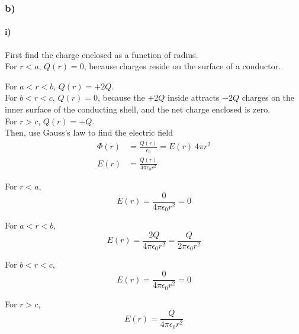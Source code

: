 \documentclass[../homework.tex]{subfiles}
\begin{document}
\subsubsection*{b)}
\paragraph{i)}

\begin{subp}

	First find the charge enclosed as a function of radius. \\


	For $r < a$, $Q(r) = 0$, because charges reside on the surface of a conductor. 

	For $a < r < b$, $Q(r) = +2Q$.\\

	For $b < r < c$, $Q(r) = 0$, because the $+2Q$ inside attracts $-2Q$ charges on the inner surface of the conducting shell, and the net charge enclosed is zero. \\

	For $r > c$, $Q(r) = +Q$. \\

	Then, use Gauss's law to find the electric field
	\begin{align*}
		\Phi(r) &= \frac{Q(r)}{\epsilon_0} = E(r)~4\pi r^2 \\
		E(r) &= \frac{Q(r)}{4 \pi \epsilon_0 r^2} 
	\end{align*}

	For $r < a$, 
	\begin{equation*}
		E(r) = \frac{0}{4 \pi \epsilon_0 r^2} = 0
	\end{equation*}

	For $a < r < b$, 
	\begin{equation*}
		E(r) = \frac{2Q}{4 \pi \epsilon_0 r^2} = \frac{Q}{2\pi \epsilon_0 r^2}
	\end{equation*}

	For $b < r < c$, 
	\begin{equation*}
		E(r) = \frac{0}{4 \pi \epsilon_0 r^2} = 0
	\end{equation*}

	For $r > c$,
	\begin{equation*}
		E(r) = \frac{Q}{4 \pi \epsilon_0 r^2} 
	\end{equation*}
\end{subp}
\end{document}
